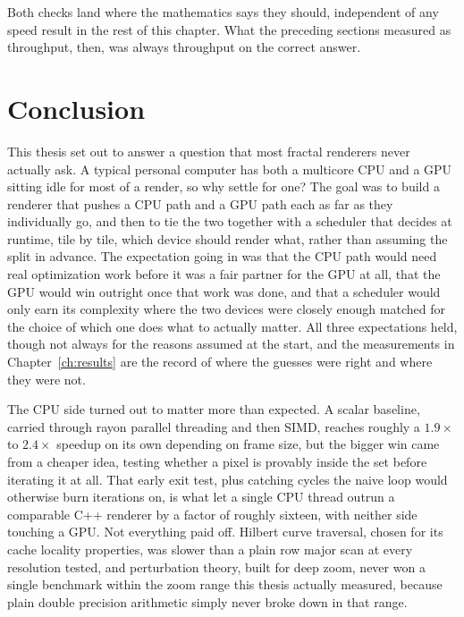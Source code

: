 \documentclass{ftndiplomski}
\begin{document}
Both checks land where the mathematics says they should, independent of
any speed result in the rest of this chapter. What the preceding sections
measured as throughput, then, was always throughput on the correct
answer.

\FloatBarrier

\chapter{Conclusion}
\label{ch:conclusion}

This thesis set out to answer a question that most fractal renderers
never actually ask. A typical personal computer has both a multicore CPU
and a GPU sitting idle for most of a render, so why settle for one? The
goal was to build a renderer that pushes a CPU path and a GPU path each
as far as they individually go, and then to tie the two together with a
scheduler that decides at runtime, tile by tile, which device should
render what, rather than assuming the split in advance. The expectation
going in was that the CPU path would need real optimization work before
it was a fair partner for the GPU at all, that the GPU would win outright
once that work was done, and that a scheduler would only earn its
complexity where the two devices were closely enough matched for the
choice of which one does what to actually matter. All three expectations
held, though not always for the reasons assumed at the start, and the
measurements in Chapter~\ref{ch:results} are the record of where the
guesses were right and where they were not.

The CPU side turned out to matter more than expected. A scalar baseline,
carried through rayon parallel threading and then SIMD, reaches roughly a
$1.9\times$ to $2.4\times$ speedup on its own depending on frame size,
but the bigger win came from a cheaper idea, testing whether a pixel is
provably inside the set before iterating it at all. That early exit
test, plus catching cycles the naive loop would otherwise burn iterations
on, is what let a single CPU thread outrun a comparable C++ renderer by a
factor of roughly sixteen, with neither side touching a GPU. Not
everything paid off. Hilbert curve traversal, chosen for its cache
locality properties, was slower than a plain row major scan at every
resolution tested, and perturbation theory, built for deep zoom, never
won a single benchmark within the zoom range this thesis actually
measured, because plain double precision arithmetic simply never broke
down in that range.
\end{document}
